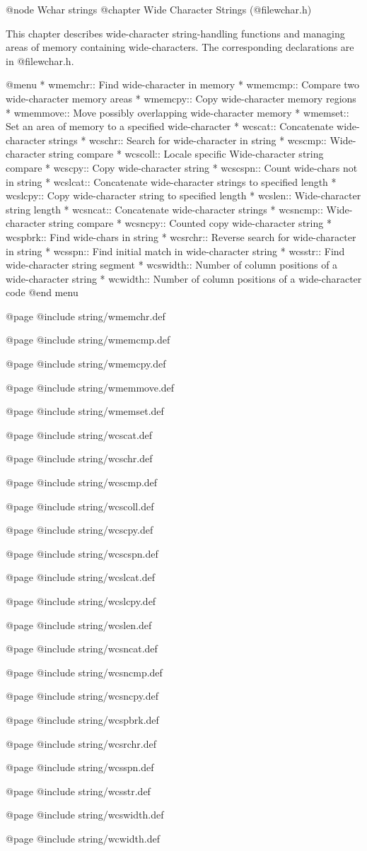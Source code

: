 @node Wchar strings
@chapter Wide Character Strings (@file{wchar.h})

This chapter describes wide-character string-handling functions and
managing areas of memory containing wide-characters.  The corresponding 
declarations are in @file{wchar.h}.

@menu
* wmemchr::     Find wide-character in memory
* wmemcmp::     Compare two wide-character memory areas
* wmemcpy::     Copy wide-character memory regions
* wmemmove::    Move possibly overlapping wide-character memory
* wmemset::     Set an area of memory to a specified wide-character
* wcscat::      Concatenate wide-character strings
* wcschr::      Search for wide-character in string
* wcscmp::      Wide-character string compare
* wcscoll::     Locale specific Wide-character string compare
* wcscpy::      Copy wide-character string
* wcscspn::     Count wide-chars not in string
* wcslcat::     Concatenate wide-character strings to specified length
* wcslcpy::     Copy wide-character string to specified length
* wcslen::      Wide-character string length
* wcsncat::     Concatenate wide-character strings
* wcsncmp::     Wide-character string compare
* wcsncpy::     Counted copy wide-character string
* wcspbrk::     Find wide-chars in string
* wcsrchr::     Reverse search for wide-character in string
* wcsspn::      Find initial match in wide-character string
* wcsstr::      Find wide-character string segment
* wcswidth::    Number of column positions of a wide-character string
* wcwidth::     Number of column positions of a wide-character code
@end menu

@page
@include string/wmemchr.def

@page
@include string/wmemcmp.def

@page
@include string/wmemcpy.def

@page
@include string/wmemmove.def

@page
@include string/wmemset.def

@page
@include string/wcscat.def

@page
@include string/wcschr.def

@page
@include string/wcscmp.def

@page
@include string/wcscoll.def

@page
@include string/wcscpy.def

@page
@include string/wcscspn.def

@page
@include string/wcslcat.def

@page
@include string/wcslcpy.def

@page
@include string/wcslen.def

@page
@include string/wcsncat.def

@page
@include string/wcsncmp.def

@page
@include string/wcsncpy.def

@page
@include string/wcspbrk.def

@page
@include string/wcsrchr.def

@page
@include string/wcsspn.def

@page
@include string/wcsstr.def

@page
@include string/wcswidth.def

@page
@include string/wcwidth.def

